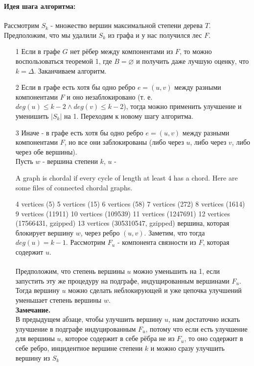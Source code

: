 \documentclass[a4paper, 12pt]{article}
\begin{document}
\textbf{Идея шага алгоритма:}
\\
\\
Рассмотрим $S_k$ - множество вершин максимальной степени дерева $T$. Предположим, что мы удалили $S_k$ из графа и у нас получился лес $F$.

\begin{enumerate}

\item[1] Если в графе $G$ нет рёбер между компонентами из $F$, то можно воспользоваться теоремой 1, где $B = \varnothing$ и получить даже лучшую оценку, что $k = \Delta$. Заканчиваем алгоритм.
\item[2] Если в графе есть хотя бы одно ребро $e = (u, v)$ между разными компонентами $F$ и оно незаблокировано (т. е. $deg(u) \leqslant k - 2 \wedge deg(v) \leqslant k - 2$), тогда можно применить улучшение и уменишить $|S_k|$ на 1. Переходим к новому шагу алгоритма.
\item[3] Иначе - в графе есть хотя бы одно ребро $e = (u, v)$ между разными компонентами $F$, но все они заблокированы (либо через $u$, либо через $v$, либо через обе вершины).\\
Пусть $w$ - вершина степени $k$, $u$ -

A graph is chordal if every cycle of length at least 4 has a chord. Here are some files of connected chordal graphs.

4 vertices (5)
5 vertices (15)
6 vertices (58)
7 vertices (272)
8 vertices (1614)
9 vertices (11911)
10 vertices (109539)
11 vertices (1247691)
12 vertices (17566431, gzipped)
13 vertices (305310547, gzipped)  вершина, которая блокирует вершину $w$, через ребро $(u, v)$. Заметим, что тогда $deg(u) = k - 1$. Рассмотрим $F_u$ - компонента связности из $F$, которая содержит $u$.\\\\
Предположим, что степень вершины $u$ можно уменьшить на 1, если запустить эту же процедуру на подграфе, индущированным вершинами $F_u$. Тогда вершину $u$ можно сделать неблокирующей и уже цепочка улучшений уменьшает степень вершины $w$.\\

\textbf{Замечание.}\\
В предыдущем абзаце, чтобы улучшить вершину $u$, нам достаточно искать улучшение в подграфе индуцированным $F_u$, потому что если есть улучшение для вершины $u$, которое содержит в себе рёбра не из $F_u$, то оно содержит в себе ребро, инцидентное вершине степени $k$ и можно сразу улучшить вершину из $S_k$
\end{enumerate}
\end{document}
